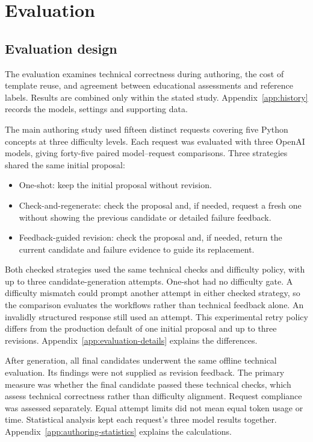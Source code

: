 \section{Evaluation}\label{sec:evaluation}

\subsection{Evaluation design}\label{sec:evaluation-design}

The evaluation examines technical correctness during authoring, the cost of template reuse, and agreement between educational assessments and reference labels. Results are combined only within the stated study. Appendix~\ref{app:history} records the models, settings and supporting data.

The main authoring study used fifteen distinct requests covering five Python concepts at three difficulty levels. Each request was evaluated with three OpenAI models, giving forty-five paired model--request comparisons. Three strategies shared the same initial proposal:

\begin{itemize}
\item One-shot: keep the initial proposal without revision.
\item Check-and-regenerate: check the proposal and, if needed, request a fresh one without showing the previous candidate or detailed failure feedback.
\item Feedback-guided revision: check the proposal and, if needed, return the current candidate and failure evidence to guide its replacement.
\end{itemize}

Both checked strategies used the same technical checks and difficulty policy, with up to three candidate-generation attempts. One-shot had no difficulty gate. A difficulty mismatch could prompt another attempt in either checked strategy, so the comparison evaluates the workflows rather than technical feedback alone. An invalidly structured response still used an attempt. This experimental retry policy differs from the production default of one initial proposal and up to three revisions. Appendix~\ref{app:evaluation-details} explains the differences.

After generation, all final candidates underwent the same offline technical evaluation. Its findings were not supplied as revision feedback. The primary measure was whether the final candidate passed these technical checks, which assess technical correctness rather than difficulty alignment. Request compliance was assessed separately. Equal attempt limits did not mean equal token usage or time. Statistical analysis kept each request's three model results together. Appendix~\ref{app:authoring-statistics} explains the calculations.


